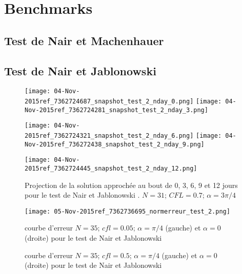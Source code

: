 \section{Benchmarks}

\subsection{Test de Nair et Machenhauer}

\subsection{Test de Nair et Jablonowski}

\begin{figure}[H]
\texttt{[image: 04-Nov-2015ref\_7362724687\_snapshot\_test\_2\_nday\_0.png]}
\texttt{[image: 04-Nov-2015ref\_7362724281\_snapshot\_test\_2\_nday\_3.png]}

\texttt{[image: 04-Nov-2015ref\_7362724321\_snapshot\_test\_2\_nday\_6.png]}
\texttt{[image: 04-Nov-2015ref\_736272438\_snapshot\_test\_2\_nday\_9.png]}

\texttt{[image: 04-Nov-2015ref\_7362724445\_snapshot\_test\_2\_nday\_12.png]}
\caption{Projection de la solution approchée au bout de 0, 3, 6, 9 et 12 jours pour le test de Nair et Jablonowski \cite{Nair2008}. $N=31$; $CFL = 0.7$; $\alpha = 3 \pi / 4$}
\label{SNAPSHOT}
\end{figure}



\begin{figure}[H]
\texttt{[image: 05-Nov-2015ref\_7362736695\_normerreur\_test\_2.png]}
\label{erreur}
\caption{courbe d'erreur $N=35$; $cfl=0.05$; $\alpha = \pi / 4$ (gauche) et $\alpha = 0$ (droite) pour le test de Nair et Jablonowski \cite{Nair2008}}
\end{figure}



\begin{figure}[H]
\label{erreur}
\caption{courbe d'erreur $N=35$; $cfl=0.5$; $\alpha = \pi / 4$ (gauche) et $\alpha = 0$ (droite) pour le test de Nair et Jablonowski \cite{Nair2008}}
\end{figure}



